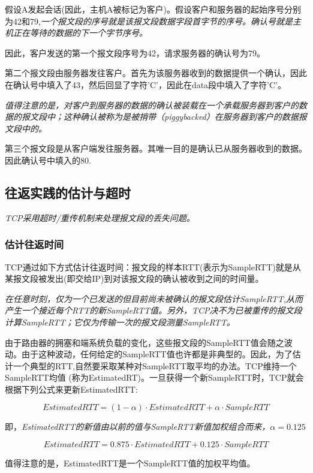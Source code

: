     假设A发起会话(因此，主机A被标记为客户)。假设客户和服务器的起始序号分别为42和79,\emph{一个报文段的序号就是该报文段数据字段首字节的序号。确认号就是主机正在等待的数据的下一个字节序号。}

    因此，客户发送的第一个报文段序号为42，请求服务器的确认号为79。

    第二个报文段由服务器发往客户。首先为该服务器收到的数据提供一个确认，因此在确认号中填入了43，然后回显了字符'C'，因此在data段中填入了字符'C'。

    \emph{值得注意的是，对客户到服务器的数据的确认被装载在一个承载服务器到客户的数据的报文段中；这种确认被称为是被捎带（piggybacked）在服务器到客户的数据报文段中的。}

    第三个报文段是从客户端发往服务器。其唯一目的是确认已从服务器收到的数据。因此确认号中填入的80.

\subsection{往返实践的估计与超时}

    \emph{TCP采用超时/重传机制来处理报文段的丢失问题。}

\subsubsection{估计往返时间}

    TCP通过如下方式估计往返时间：报文段的样本RTT(表示为SampleRTT)就是从某报文段被发出(即交给IP)到对该报文段的确认被收到之间的时间量。

    \emph{在任意时刻，仅为一个已发送的但目前尚未被确认的报文段估计SampleRTT,从而产生一个接近每个RTT的新SampleRTT值。另外，TCP决不为已被重传的报文段计算SampleRTT；它仅为传输一次的报文段测量SampleRTT。}

    由于路由器的拥塞和端系统负载的变化，这些报文段的SampleRTT值会随之波动。由于这种波动，任何给定的SampleRTT值也许都是非典型的。因此，为了估计一个典型的RTT,自然要采取某种对SampleRTT取平均的办法。TCP维持一个SampleRTT均值 (称为EstimatedRT)。一旦获得一个新SampleRTT时，TCP就会根据下列公式来更新EstimatedRTT:

$$
    EstimatedRTT = (1 - \alpha) \cdot EstimatedRTT + \alpha \cdot SampleRTT
$$

    即，\emph{EstimatedRTT的新值由以前的值与SampleRTT新值加权组合而来，$\alpha = 0.125$}

$$
    EstimatedRTT = 0.875 \cdot EstimatedRTT + 0.125 \cdot SampleRTT
$$

    值得注意的是，EstimatedRTT是一个SampleRTT值的加权平均值。

